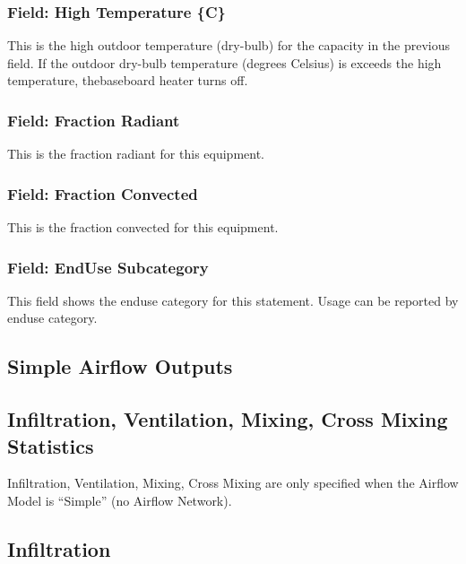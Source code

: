 \subsubsection{Field: High Temperature \{C\}}\label{field-high-temperature-c}

This is the high outdoor temperature (dry-bulb) for the capacity in the previous field. If the outdoor dry-bulb temperature (degrees Celsius) is exceeds the high temperature, thebaseboard heater turns off.

\subsubsection{Field: Fraction Radiant}\label{field-fraction-radiant-4}

This is the fraction radiant for this equipment.

\subsubsection{Field: Fraction Convected}\label{field-fraction-convected-4}

This is the fraction convected for this equipment.

\subsubsection{Field: EndUse Subcategory}\label{field-enduse-subcategory}

This field shows the enduse category for this statement. Usage can be reported by enduse category.

\subsection{Simple Airflow Outputs}\label{simple-airflow-outputs}

\subsection{Infiltration, Ventilation, Mixing, Cross Mixing Statistics}\label{infiltration-ventilation-mixing-cross-mixing-statistics}

Infiltration, Ventilation, Mixing, Cross Mixing are only specified when the Airflow Model is ``Simple'' (no Airflow Network).

\subsection{Infiltration}\label{infiltration}

